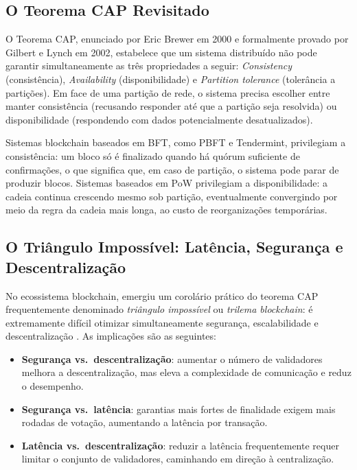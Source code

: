 \documentclass[12pt,a4paper]{report}
\begin{document}
\subsection{O Teorema CAP Revisitado}

O Teorema CAP, enunciado por Eric Brewer em 2000 e formalmente provado por Gilbert e Lynch em 2002, estabelece que um sistema distribuído não pode garantir simultaneamente as três propriedades a seguir: \textit{Consistency} (consistência), \textit{Availability} (disponibilidade) e \textit{Partition tolerance} (tolerância a partições). Em face de uma partição de rede, o sistema precisa escolher entre manter consistência (recusando responder até que a partição seja resolvida) ou disponibilidade (respondendo com dados potencialmente desatualizados).

Sistemas blockchain baseados em BFT, como PBFT e Tendermint, privilegiam a consistência: um bloco só é finalizado quando há quórum suficiente de confirmações, o que significa que, em caso de partição, o sistema pode parar de produzir blocos. Sistemas baseados em PoW privilegiam a disponibilidade: a cadeia continua crescendo mesmo sob partição, eventualmente convergindo por meio da regra da cadeia mais longa, ao custo de reorganizações temporárias.

\subsection[O Triângulo Impossível]{O Triângulo Impossível: Latência, Segurança e Descentralização}

No ecossistema blockchain, emergiu um corolário prático do teorema CAP frequentemente denominado \textit{triângulo impossível} ou \textit{trilema blockchain}: é extremamente difícil otimizar simultaneamente segurança, escalabilidade e descentralização \cite{Bashir2023}. As implicações são as seguintes:

\begin{itemize}
    \item \textbf{Segurança vs.\ descentralização}: aumentar o número de validadores melhora a descentralização, mas eleva a complexidade de comunicação e reduz o desempenho.
    \item \textbf{Segurança vs.\ latência}: garantias mais fortes de finalidade exigem mais rodadas de votação, aumentando a latência por transação.
    \item \textbf{Latência vs.\ descentralização}: reduzir a latência frequentemente requer limitar o conjunto de validadores, caminhando em direção à centralização.
\end{itemize}
\end{document}
